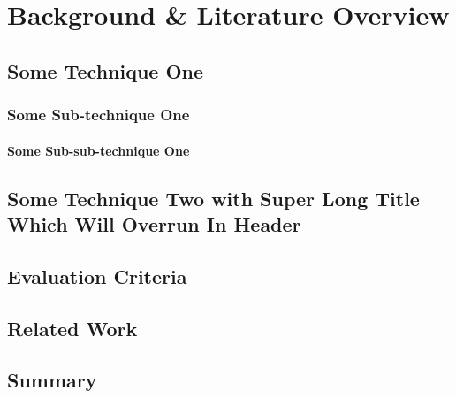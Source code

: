 \chapter{Background \& Literature Overview}

\section{Some Technique One}
\subsection{Some Sub-technique One}
\subsubsection{Some Sub-sub-technique One}

\section[Some Technique Two]{Some Technique Two with Super Long Title Which Will Overrun In Header}




\section{Evaluation Criteria}

\section{Related Work}


\section{Summary}